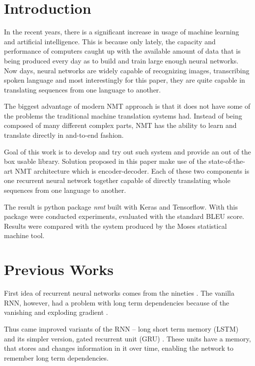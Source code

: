 \documentclass{ExcelAtFIT}
\affiliation{*%
  \href{mailto:xholcn01@stud.fit.vutbr.cz}{xholcn01@stud.fit.vutbr.cz},
  \textit{Faculty of Information Technology, Brno University of Technology}}
\begin{document}
\startdocument


\section{Introduction}
In the recent years, there is a significant increase in usage of machine learning and artificial intelligence. This is because only lately, the capacity and performance of computers caught up with the available amount of data that is being produced every day as to build and train large enough neural networks. Now days, neural networks are widely capable of recognizing images, transcribing spoken language and most interestingly for this paper, they are quite capable in translating sequences from one language to another.

The biggest advantage of modern NMT approach is that it does not have some of the problems the traditional machine translation systems had. Instead of being composed of many different complex parts, NMT has the ability to learn and translate directly in and-to-end fashion.

Goal of this work is to develop and try out such system and provide an out of the box usable library. Solution proposed in this paper make use of the state-of-the-art NMT architecture which is encoder-decoder. Each of these two components is one recurrent neural network together capable of directly translating whole sequences from one language to another.

The result is python package \emph{nmt} built with Keras and Tensorflow. With this package were conducted experiments, evaluated with the standard BLEU score. Results were compared with the system produced by the Moses \cite{Moses} statistical machine tool.


\section{Previous Works}
First idea of recurrent neural networks comes from the nineties \cite{rnn}. The vanilla RNN, however, had a problem with long term dependencies because of the vanishing and exploding gradient \cite{gradientProblems}.

Thus came improved variants of the RNN -- long short term memory (LSTM) \cite{LSTM, forgetLSTM} and its simpler version, gated recurrent unit (GRU) \cite{GRU}. These units have a memory, that stores and changes information in it over time, enabling the network to remember long term dependencies.
\end{document}
